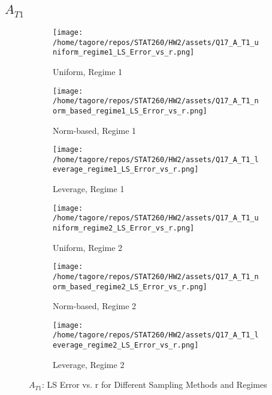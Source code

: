 \documentclass{article}
\begin{document}
\newpage

\subsection*{\(A_{T1}\)}

\begin{figure}[H]
    \centering
    \begin{subfigure}[b]{0.32\textwidth}
        \centering
        \texttt{[image: /home/tagore/repos/STAT260/HW2/assets/Q17\_A\_T1\_uniform\_regime1\_LS\_Error\_vs\_r.png]}
        \caption{Uniform, Regime 1}
        \label{fig:T1_uniform_regime1}
    \end{subfigure}
    \begin{subfigure}[b]{0.32\textwidth}
        \centering
        \texttt{[image: /home/tagore/repos/STAT260/HW2/assets/Q17\_A\_T1\_norm\_based\_regime1\_LS\_Error\_vs\_r.png]}
        \caption{Norm-based, Regime 1}
        \label{fig:T1_norm_based_regime1}
    \end{subfigure}
    \begin{subfigure}[b]{0.32\textwidth}
        \centering
        \texttt{[image: /home/tagore/repos/STAT260/HW2/assets/Q17\_A\_T1\_leverage\_regime1\_LS\_Error\_vs\_r.png]}
        \caption{Leverage, Regime 1}
        \label{fig:T1_leverage_regime1}
    \end{subfigure}
    
    \vspace{0.5cm}
    
    \begin{subfigure}[b]{0.32\textwidth}
        \centering
        \texttt{[image: /home/tagore/repos/STAT260/HW2/assets/Q17\_A\_T1\_uniform\_regime2\_LS\_Error\_vs\_r.png]}
        \caption{Uniform, Regime 2}
        \label{fig:T1_uniform_regime2}
    \end{subfigure}
    \begin{subfigure}[b]{0.32\textwidth}
        \centering
        \texttt{[image: /home/tagore/repos/STAT260/HW2/assets/Q17\_A\_T1\_norm\_based\_regime2\_LS\_Error\_vs\_r.png]}
        \caption{Norm-based, Regime 2}
        \label{fig:T1_norm_based_regime2}
    \end{subfigure}
    \begin{subfigure}[b]{0.32\textwidth}
        \centering
        \texttt{[image: /home/tagore/repos/STAT260/HW2/assets/Q17\_A\_T1\_leverage\_regime2\_LS\_Error\_vs\_r.png]}
        \caption{Leverage, Regime 2}
        \label{fig:T1_leverage_regime2}
    \end{subfigure}
    
    \caption{\(A_{T1}\): LS Error vs. r for Different Sampling Methods and Regimes}
    \label{fig:T1_comparison}
\end{figure}
\end{document}

